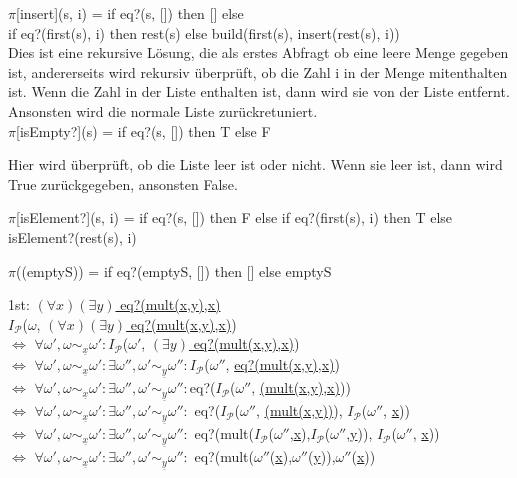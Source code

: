 \documentclass[10pt, a4paper]{article}
\newcommand{\letpi}{$\pi$}
\newcommand{\letomega}{$\omega$}
\newcommand{\InterP}{$I_{\mathcal{P}}$}
\newcommand{\unl}[1]{\underline{#1}}
\begin{document}
\letpi[insert](s, i) = if eq?(s, []) then [] else\vspace{2pt}\\
if eq?(first(s), i) then rest(s) else build(first(s), insert(rest(s), i))\vspace{2pt}\\
Dies ist eine rekursive Lösung, die als erstes Abfragt ob eine leere Menge gegeben ist, andererseits wird rekursiv überprüft, ob die Zahl i in der Menge mitenthalten ist. Wenn die Zahl in der Liste enthalten ist, dann wird sie von der Liste entfernt. Ansonsten wird die normale Liste zurückretuniert.\\

\letpi[isEmpty?](s) = if eq?(s, []) then T else F

Hier wird überprüft, ob die Liste leer ist oder nicht. Wenn sie leer ist, dann wird True zurückgegeben, ansonsten False.

\letpi[isElement?](s, i) = if eq?(s, []) then F else if eq?(first(s), i) then T else isElement?(rest(s), i)

\letpi((emptyS)) = if eq?(emptyS, []) then [] else emptyS


1st: \unl{$(\forall x)(\exists y)$ eq?(mult(x,y),x)} 
\vspace{12pt} \\
\InterP(\letomega, \unl{$(\forall x)(\exists y)$ eq?(mult(x,y),x)}) \vspace{2pt} \\
$\iff$ $\forall \omega', \omega \sim_{\unl{x}} \omega' : $\InterP($\omega'$, \unl{$(\exists y)$ eq?(mult(x,y),x)}) \vspace{2pt} \\
$\iff$ $\forall \omega', \omega \sim_{\unl{x}} \omega' : \exists \omega'', \omega' \sim_{\unl{y}} \omega'' : $\InterP($\omega''$, \unl{eq?(mult(x,y),x)}) \vspace{2pt} \\
$\iff$ $\forall \omega', \omega \sim_{\unl{x}} \omega' : \exists \omega'', \omega' \sim_{\unl{y}} \omega'' : $eq?(\InterP($\omega''$, \unl{(mult(x,y),x)})) \vspace{2pt} \\
$\iff$ $\forall \omega', \omega \sim_{\unl{x}} \omega' : \exists \omega'', \omega' \sim_{\unl{y}} \omega'' :$ eq?(\InterP($\omega''$, \unl{(mult(x,y))}), \InterP($\omega''$, \unl{x})) \vspace{2pt} \\
$\iff$ $\forall \omega', \omega \sim_{\unl{x}} \omega' : \exists \omega'', \omega' \sim_{\unl{y}} \omega'' :$ eq?(mult(\InterP($\omega''$,\unl{x}),\InterP($\omega''$,\unl{y})), \InterP($\omega''$, \unl{x})) \vspace{2pt} \\
$\iff$ $\forall \omega', \omega \sim_{\unl{x}} \omega' : \exists \omega'', \omega' \sim_{\unl{y}} \omega'' :$ eq?(mult($\omega''$(\unl{x}),$\omega''$(\unl{y})),$\omega''$(\unl{x})) \vspace{12pt}
\end{document}
